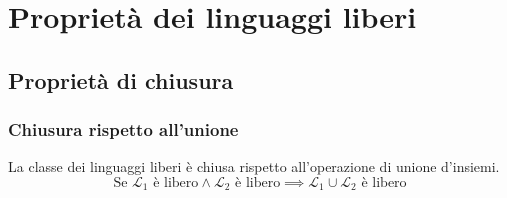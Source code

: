\documentclass[class=book, crop=false, oneside, 12pt]{standalone}
\begin{document}
\chapter{Proprietà dei linguaggi liberi}  
  
\section{Proprietà di chiusura}
\subsection*{Chiusura rispetto all'unione}
\begin{lemma}
  La classe dei linguaggi liberi è chiusa rispetto all'operazione di unione d'insiemi.
  \begin{equation*}
    \textrm{Se } \mathcal{L}_1 \textrm{ è libero} \land \mathcal{L}_2 \textrm{ è libero} \implies \mathcal{L}_1 \cup \mathcal{L}_2 \textrm{ è libero}
  \end{equation*}
\end{lemma}
\end{document}

